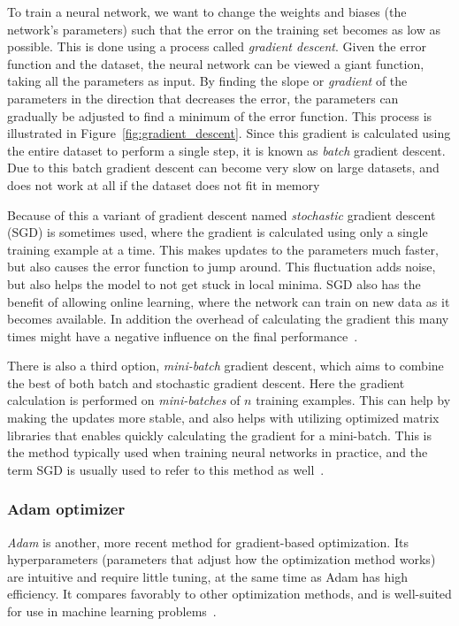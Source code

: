 \documentclass{kththesis}
\begin{document}
To train a neural network, we want to change the weights and biases (the network's parameters) such that the error on the training set becomes as low as possible. This is done using a process called \textit{gradient descent}. Given the error function and the dataset, the neural network can be viewed a giant function, taking all the parameters as input. By finding the slope or \textit{gradient} of the parameters in the direction that decreases the error, the parameters can gradually be adjusted to find a minimum of the error function. This process is illustrated in Figure~\ref{fig:gradient_descent}. Since this gradient is calculated using the entire dataset to perform a single step, it is known as \textit{batch} gradient descent. Due to this batch gradient descent can become very slow on large datasets, and does not work at all if the dataset does not fit in memory~\cite{gradient_descent}

Because of this a variant of gradient descent named \textit{stochastic} gradient descent (SGD) is sometimes used, where the gradient is calculated using only a single training example at a time. This makes updates to the parameters much faster, but also causes the error function to jump around. This fluctuation adds noise, but also helps the model to not get stuck in local minima. SGD also has the benefit of allowing online learning, where the network can train on new data as it becomes available. In addition the overhead of calculating the gradient this many times might have a negative influence on the final performance~\cite{gradient_descent}.

There is also a third option, \textit{mini-batch} gradient descent, which aims to combine the best of both batch and stochastic gradient descent. Here the gradient calculation is performed on \textit{mini-batches} of $n$ training examples. This can help by making the updates more stable, and also helps with utilizing optimized matrix libraries that enables quickly calculating the gradient for a mini-batch. This is the method typically used when training neural networks in practice, and the term SGD is usually used to refer to this method as well~\cite{gradient_descent}.

\subsubsection{Adam optimizer}
\textit{Adam} is another, more recent method for gradient-based optimization. Its hyperparameters (parameters that adjust how the optimization method works) are intuitive and require little tuning, at the same time as Adam has high efficiency. It compares favorably to other optimization methods, and is well-suited for use in machine learning problems~\cite{adam}.
\end{document}
